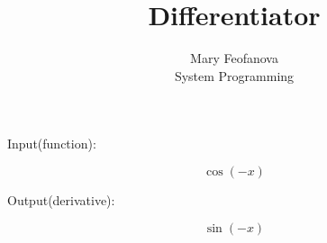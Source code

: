 \documentclass[12pt]{article}
\begin{document}
\title{Differentiator}
\author{Mary Feofanova\\
System Programming}
 
\maketitle
\begin{center}
Input(function):
\end{center}
$$\cos(-x)$$
\begin{center}
Output(derivative):
\end{center}
$$\sin(-x)$$
\end{document}
